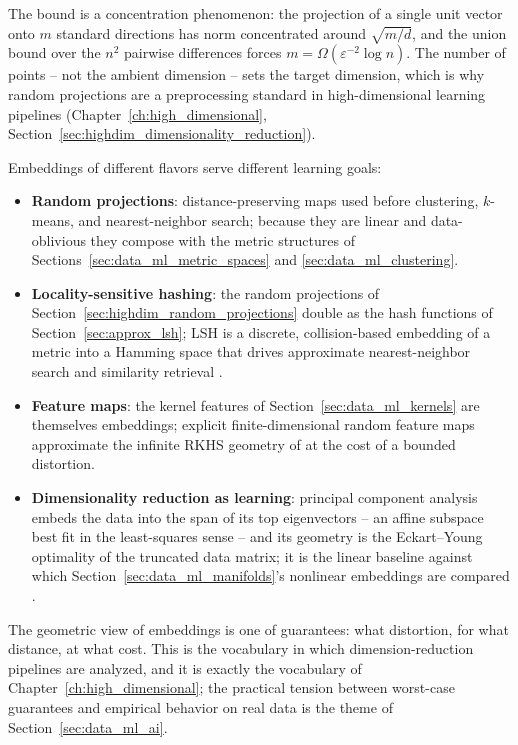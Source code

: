 \begin{remark}\label{rem:data_ml_jl_dimension}
  The bound is a concentration phenomenon: the projection of a single
  unit vector onto $m$ standard directions has norm concentrated around
  $\sqrt{m/d}$, and the union bound over the $n^2$ pairwise differences
  forces $m = \Omega(\varepsilon^{-2} \log n)$. The number of points -- not
  the ambient dimension -- sets the target dimension, which is why random
  projections are a preprocessing standard in high-dimensional learning
  pipelines (Chapter~\ref{ch:high_dimensional},
  Section~\ref{sec:highdim_dimensionality_reduction}).
\end{remark}

Embeddings of different flavors serve different learning goals:
\begin{itemize}
\item \textbf{Random projections}: distance-preserving maps used before
  clustering, $k$-means, and nearest-neighbor search; because they are
  linear and data-oblivious they compose with the metric structures of
  Sections~\ref{sec:data_ml_metric_spaces} and \ref{sec:data_ml_clustering}.
\item \textbf{Locality-sensitive hashing}: the random projections of
  Section~\ref{sec:highdim_random_projections} double as the hash functions
  of Section~\ref{sec:approx_lsh}; LSH is a discrete, collision-based
  embedding of a metric into a Hamming space that drives approximate
  nearest-neighbor search and similarity retrieval \cite{indyk1998,andoni2006}.
\item \textbf{Feature maps}: the kernel features of
  Section~\ref{sec:data_ml_kernels} are themselves embeddings; explicit
  finite-dimensional random feature maps approximate the infinite
  RKHS geometry of \cite{muller2001} at the cost of a bounded distortion.
\item \textbf{Dimensionality reduction as learning}: principal component
  analysis embeds the data into the span of its top eigenvectors -- an
  affine subspace best fit in the least-squares sense -- and its geometry is
  the Eckart--Young optimality of the truncated data matrix; it is the
  linear baseline against which Section~\ref{sec:data_ml_manifolds}'s
  nonlinear embeddings are compared \cite{bishop2006,hastie2009}.
\end{itemize}

\begin{remark}
  The geometric view of embeddings is one of guarantees: what distortion,
  for what distance, at what cost. This is the vocabulary in which
  dimension-reduction pipelines are analyzed, and it is exactly the
  vocabulary of Chapter~\ref{ch:high_dimensional}; the practical tension
  between worst-case guarantees and empirical behavior on real data is the
  theme of Section~\ref{sec:data_ml_ai}.
\end{remark}

